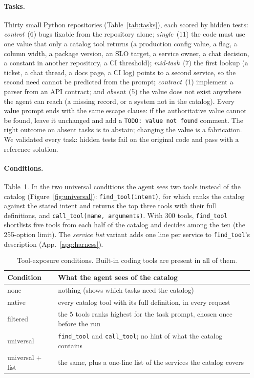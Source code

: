 \paragraph{Tasks.} Thirty small Python repositories (Table~\ref{tab:tasks}), each scored by hidden tests:
\emph{control}~(6) bugs fixable from the repository alone; \emph{single}~(11) the code must use one value that
only a catalog tool returns (a production config value, a flag, a column width, a package version, an SLO
target, a service owner, a chat decision, a constant in another repository, a CI threshold); \emph{mid-task}~(7)
the first lookup (a ticket, a chat thread, a docs page, a CI log) points to a second service, so the second need
cannot be predicted from the prompt; \emph{contract}~(1) implement a parser from an API contract; and
\emph{absent}~(5) the value does not exist anywhere the agent can reach (a missing record, or a system not in
the catalog). Every value prompt ends with the same escape clause: if the authoritative value cannot be found,
leave it unchanged and add a \texttt{TODO: value not found} comment. The right outcome on absent tasks is to
abstain; changing the value is a fabrication. We validated every task: hidden tests fail on the original code
and pass with a reference solution.

\paragraph{Conditions.} Table~\ref{tab:hconditions}. In the two universal conditions the agent sees two tools
instead of the catalog (Figure~\ref{fig:universal}): \texttt{find\_tool(intent)}, for which \msd{} ranks
the catalog against the stated intent and returns the top three tools with their full definitions, and
\texttt{call\_tool(name, arguments)}. With 300 tools, \texttt{find\_tool} shortlists five tools from each half of
the catalog and decides among the ten (the 255-option limit). The \emph{service list} variant adds one line per
service to \texttt{find\_tool}'s description (App.~\ref{app:harness}).

\begin{table}[t]
\centering\small
\caption{Tool-exposure conditions. Built-in coding tools are present in all of them.}
\label{tab:hconditions}
\begin{tabularx}{\linewidth}{@{}l X@{}}
\toprule
Condition & What the agent sees of the catalog \\
\midrule
none & nothing (shows which tasks need the catalog) \\
native & every catalog tool with its full definition, in every request \\
filtered & the 5 tools \msd{} ranks highest for the task prompt, chosen once before the run \\
universal & \texttt{find\_tool} and \texttt{call\_tool}; no hint of what the catalog contains \\
universal + list & the same, plus a one-line list of the services the catalog covers \\
\bottomrule
\end{tabularx}
\end{table}

